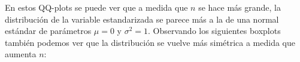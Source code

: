 \documentclass[a4paper]{article}
\begin{document}
	En estos QQ-plots se puede ver que a medida que $n$ se hace m\'as grande, la distribuci\'on de la variable estandarizada se parece m\'as a la de una normal est\'andar de par\'ametros $\mu = 0$ y $\sigma^2 = 1$.
	Observando los siguientes boxplots tambi\'en podemos ver que la distribuci\'on se vuelve m\'as sim\'etrica a medida que aumenta $n$:
	
	\begin{figure}[H]
		\centering
		\hfill
	\end{figure}
	
\end{document}
